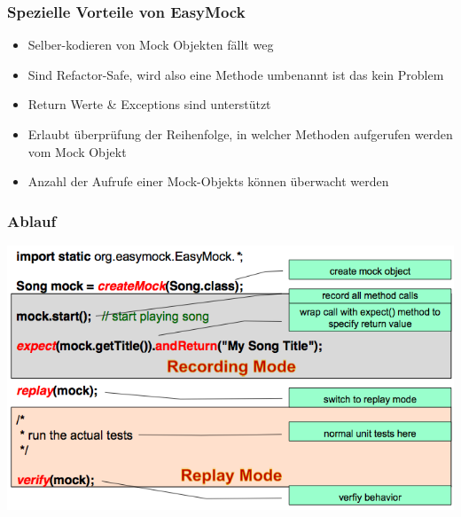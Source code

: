 \documentclass[a4paper,10pt]{article}
\begin{document}
\subsubsection{Spezielle Vorteile von EasyMock}
\begin{itemize}
\item Selber-kodieren von Mock Objekten f\"{a}llt weg
\item Sind Refactor-Safe, wird also eine Methode umbenannt ist das kein Problem
\item Return Werte \& Exceptions sind unterst\"{u}tzt
\item Erlaubt \"{u}berpr\"{u}fung der Reihenfolge, in welcher Methoden aufgerufen werden vom Mock Objekt
\item Anzahl der Aufrufe einer Mock-Objekts k\"{o}nnen \"{u}berwacht werden
\end{itemize}

\subsubsection{Ablauf}
\includegraphics[scale=0.6]{easymock.png} \\
\end{document}

